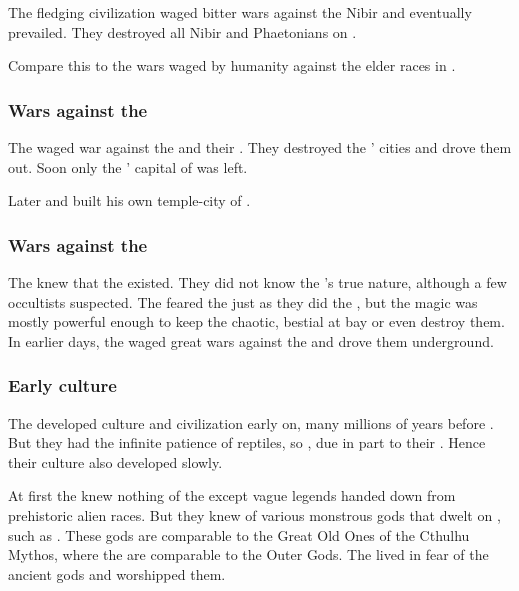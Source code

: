 The fledging \ophidian civilization waged bitter wars against the Nibir and eventually prevailed. 
They destroyed all Nibir and Phaetonians on \Miith. 

Compare this to the wars waged by humanity against the elder races in \cite{RobertEHoward:TheShadowKingdom}. 





\subsubsection[Wars against the Shugul]{Wars against the \moonthings}
The \ophidians waged war against the \moonthings and their \moongods.
They destroyed the \moonthings' cities and drove them out.
Soon only the \moonthings' capital of \Nom was left.

Later  and built his own temple-city of \Baltherium.





\subsubsection{Wars against the \noggyaleth}
The \ophidians knew that the \noggyaleth existed. 
They did not know the \noggyaleth's true nature, although a few occultists suspected.
The \ophidians feared the \noggyaleth just as they did the \xss, but the \ophidian magic was mostly powerful enough to keep the chaotic, bestial \noggyaleth at bay or even destroy them.
In earlier days, the \ophidians waged great wars against the \noggyaleth and drove them underground.





\subsubsection{Early \ophidian culture}
The \ophidians developed culture and civilization early on, many millions of years before \Tiamat. 
But they had the infinite patience of reptiles, so , due in part to their .
Hence their culture also developed slowly. 

At first the \ophidians knew nothing of the \xss except vague legends handed down from prehistoric alien races. 
But they knew of various monstrous gods that dwelt on \Miith, such as \Ubloth. 
These \Miithian gods are comparable to the Great Old Ones of the Cthulhu Mythos, where the \xss are comparable to the Outer Gods. 
The \ophidians lived in fear of the ancient gods and worshipped them. 

